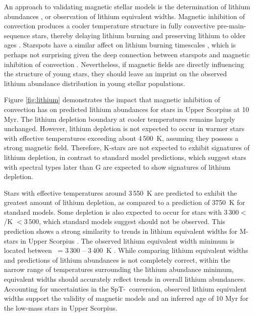 \documentclass{aa}
\begin{document}
An approach to validating magnetic stellar models is the determination of lithium abundances \citep{MacDonald2015}, or observation of lithium equivalent widths. Magnetic inhibition of convection produces a cooler temperature structure in fully convective pre-main-sequence stars, thereby delaying lithium burning and preserving lithium to older ages \citep{Ventura1998, DAntona2000, MM10, FC13, Malo2014, MacDonald2015}. Starspots have a similar affect on lithium burning timescales \citep{Jackson2014b, Somers2015b}, which is perhaps not surprising given the deep connection between starspots and magnetic inhibition of convection \citep{Biermann1941, Deinzer1965}. Nevertheless, if magnetic fields are directly influencing the structure of young stars, they should leave an imprint on the observed lithium abundance distribution in young stellar populations.
 
Figure \ref{fig:lithium} demonstrates the impact that magnetic inhibition of convection has on predicted lithium abundances for stars in Upper Scorpius at 10 Myr. The lithium depletion boundary at cooler temperatures remains largely unchanged. However, lithium depletion is not expected to occur in warmer stars with effective temperatures exceeding about 4\,500~K, assuming they possess a strong magnetic field. Therefore, K-stars are not expected to exhibit signatures of lithium depletion, in contrast to standard model predictions, which suggest stars with spectral types later than G are expected to show signatures of lithium depletion. 

Stars with effective temperatures around 3\,550~K are predicted to exhibit the greatest amount of lithium depletion, as compared to a prediction of 3750~K for standard models. Some depletion is also expected to occur for stars with $3\,300 <$ \teff/K $< 3\,500$, which standard models suggest should not be observed. This prediction shows a strong similarity to trends in lithium equivalent widths for M-stars in Upper Scorpius \citep{Rizzuto2015}. The observed lithium equivalent width minimum is located between \teff\ = 3\,300 -- 3\,400~K \citep{Rizzuto2015}. While comparing lithium equivalent widths and predictions of lithium abundances is not completely correct, within the narrow range of temperatures surrounding the lithium abundance minimum, equivalent widths should accurately reflect trends in overall lithium abundances. Accounting for uncertainties in the SpT-\teff\ conversion, observed lithium equivalent widths support the validity of magnetic models and an inferred age of 10 Myr for the low-mass stars in Upper Scorpius. 
\end{document}
